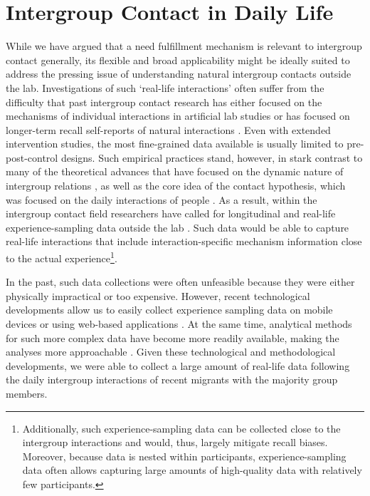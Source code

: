 \documentclass[man, 12pt, a4paper, mask]{apa7}
\theoremstyle{break}
\theoremstyle{plain}
\begin{document}
\section{Intergroup Contact in Daily Life}
While we have argued that a need fulfillment mechanism is relevant to intergroup contact generally, its flexible and broad applicability might be ideally suited to address the pressing issue of understanding natural intergroup contacts outside the lab. Investigations of such `real-life interactions' often suffer from the difficulty that past intergroup contact research has either focused on the mechanisms of individual interactions in artificial lab studies or has focused on longer-term recall self-reports of natural interactions \citep[e.g.,][]{Pettigrew2006}. Even with extended intervention studies, the most fine-grained data available is usually limited to pre-post-control designs. Such empirical practices stand, however, in stark contrast to many of the theoretical advances that have focused on the dynamic nature of intergroup relations \citep[e.g.,][]{Pettigrew1998}, as well as the core idea of the contact hypothesis, which was focused on the daily interactions of people \citep[][]{Allport1954b}. As a result, within the intergroup contact field researchers have called for longitudinal \citep[][]{Pettigrew1998, Pettigrew2008, Pettigrew2008b, Pettigrew2011} and real-life experience-sampling data outside the lab \citep[][]{MacInnis2015, McKeown2017, Dixon2005}. Such data would be able to capture real-life interactions that include interaction-specific mechanism information close to the actual experience\footnote{Additionally, such experience-sampling data can be collected close to the intergroup interactions and would, thus, largely mitigate recall biases. Moreover, because data is nested within participants, experience-sampling data often allows capturing large amounts of high-quality data with relatively few participants.}.

In the past, such data collections were often unfeasible because they were either physically impractical or too expensive. However, recent technological developments allow us to easily collect experience sampling data on mobile devices \citep[e.g.,][]{Keil2020} or using web-based applications \citep[e.g.,][]{Arslan2020}. At the same time, analytical methods for such more complex data have become more readily available, making the analyses more approachable \citep[e.g., see][]{ODonnell2021}. Given these technological and methodological developments, we were able to collect a large amount of real-life data following the daily intergroup interactions of recent migrants with the majority group members.  
\end{document}
